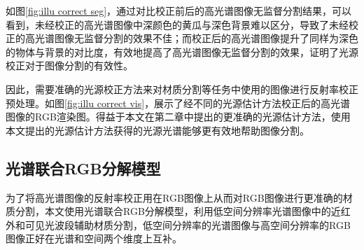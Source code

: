 \documentclass[
    type = master, %
    degree = academic,        %
    decl-page,  %
  ]{njuthesis}
\begin{document}
如图\ref{fig:illu correct seg}，通过对比校正前后的高光谱图像无监督分割结果，可以看到，未经校正的高光谱图像中深颜色的黄瓜与深色背景难以区分，导致了未经校正的高光谱图像无监督分割的效果不佳；而校正后的高光谱图像提升了同样为深色的物体与背景的对比度，有效地提高了高光谱图像无监督分割的效果，证明了光源校正对于图像分割的有效性。


因此，需要准确的光源校正方法来对材质分割等任务中使用的图像进行反射率校正预处理。如图\ref{fig:illu correct vis}，展示了经不同的光源估计方法校正后的高光谱图像的RGB渲染图。得益于本文在第二章中提出的更准确的光源估计方法，使用本文提出的光源估计方法获得的光源光谱能够更有效地帮助图像分割。



\subsection{光谱联合RGB分解模型}



为了将高光谱图像的反射率校正用在RGB图像上从而对RGB图像进行更准确的材质分割，本文使用光谱联合RGB分解模型，利用低空间分辨率光谱图像中的近红外和可见光波段辅助材质分割，低空间分辨率的光谱图像与高空间分辨率的RGB图像正好在光谱和空间两个维度上互补。
\end{document}
